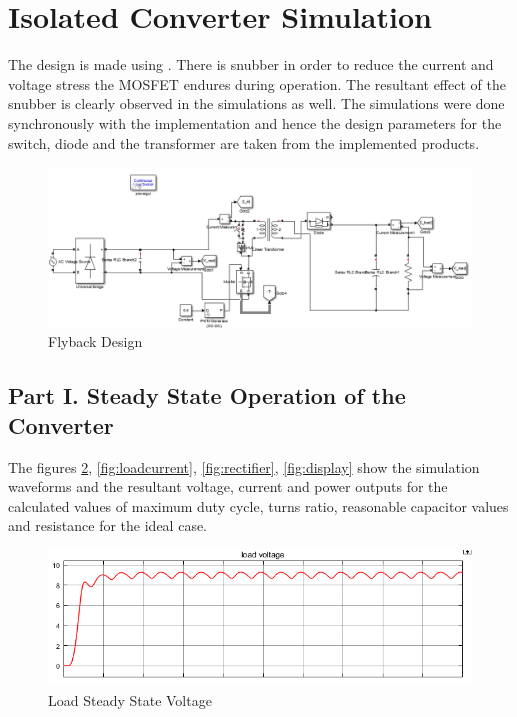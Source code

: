 \documentclass[12pt]{article}
\begin{document}
\section{Isolated Converter Simulation}

The design is made using \cite{}. There is snubber in order to reduce the current and voltage stress the MOSFET endures during operation. The resultant effect of the snubber is clearly observed in the simulations as well. The simulations were done synchronously with the implementation and hence the design parameters for the switch, diode and the transformer are taken from the implemented products.

\begin{figure}[H]
    \centering
    \includegraphics[width=15 cm]{Design}
    \caption{Flyback Design}
    \label{fig:design}
\end{figure}

\subsection{Part I. Steady State Operation of the Converter}

The figures \ref{fig:loadvoltage}, \ref{fig:loadcurrent}, \ref{fig:rectifier}, \ref{fig:display} show the simulation waveforms and the resultant voltage, current and power outputs for the calculated values of maximum duty cycle, turns ratio, reasonable capacitor values and resistance for the ideal case.



\begin{figure}[H]
    \centering
    \includegraphics[width=15 cm]{LoadVoltage}
    \caption{Load Steady State Voltage}
    \label{fig:loadvoltage}
\end{figure}
\end{document}
